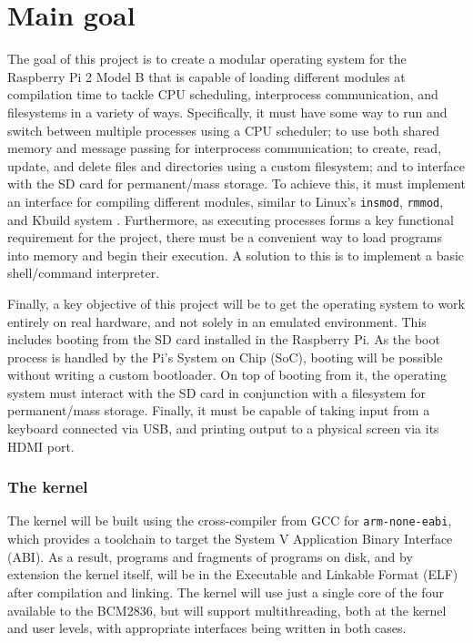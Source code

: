 \documentclass[10pt,a4paper]{article}
\newcommand{\code}[1]{\texttt{#1}}
\begin{document}
\section*{Main goal}
The goal of this project is to create a modular operating system for the
Raspberry Pi 2 Model B that is capable of loading different modules at
compilation time to tackle CPU scheduling, interprocess communication, and
filesystems in a variety of ways. Specifically, it must have some way to run and
switch between multiple processes using a CPU scheduler; to use both shared
memory and message passing for interprocess communication; to
create, read, update, and delete files and directories using a custom
filesystem; and to interface with the SD card for permanent/mass storage.  To
achieve this, it must implement an interface for compiling different modules,
similar to Linux's \code{insmod}, \code{rmmod}, and Kbuild system \cite{insmod,
Kbuild}.  Furthermore, as executing processes forms a key functional requirement
for the project, there must be a convenient way to load programs into memory and
begin their execution. A solution to this is to implement a basic shell/command
interpreter.

Finally, a key objective of this project will be to get the operating system to
work entirely on real hardware, and not solely in an emulated environment. This
includes booting from the SD card installed in the Raspberry Pi. As the boot
process is handled by the Pi's System on Chip (SoC), booting will be possible
without writing a custom bootloader. On top of booting from it, the operating
system must interact with the SD card in conjunction with a filesystem for
permanent/mass storage. Finally, it must be capable of taking input from a
keyboard connected via USB, and printing output to a physical screen via its
HDMI port.

\subsubsection*{The kernel}
The kernel will be built using the cross-compiler from GCC for
\code{arm-none-eabi}, which provides a toolchain to target the System V
Application Binary Interface (ABI). As a result, programs and fragments of
programs on disk, and by extension the kernel itself, will be in the Executable
and Linkable Format (ELF) after compilation and linking. The kernel will use
just a single core of the four available to the BCM2836, but will support
multithreading, both at the kernel and user levels, with appropriate interfaces
being written in both cases. 
\end{document}
